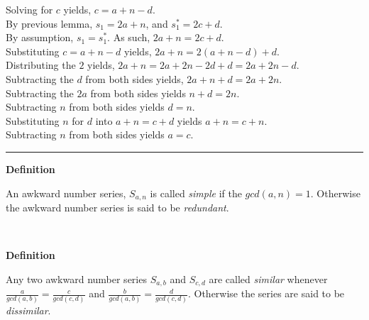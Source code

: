 \documentclass[a4paper,12pt]{article}
\begin{document}
\noindent Solving for $c$ yields, $c = a + n - d$.\\

\noindent By previous lemma, $s_1 = 2a + n$, and $s^*_1 = 2c + d$.\\

\noindent By assumption, $s_1 = s^*_1$. As such, $2a + n = 2c + d$.\\

\noindent Substituting $c = a + n - d$ yields, $2a + n = 2(a + n - d) + d$.\\

\noindent Distributing the $2$ yields, $2a + n = 2a + 2n - 2d + d = 2a + 2n - d$.\\

\noindent Subtracting the $d$ from both sides yields, $2a + n + d = 2a + 2n$.\\

\noindent Subtracting the $2a$ from both sides yields $n + d = 2n$.\\

\noindent Subtracting $n$ from both sides yields $d = n$.\\

\noindent Substituting $n$ for $d$ into $a + n = c + d$ yields $a + n = c + n$.\\

\noindent Subtracting $n$ from both sides yields $a = c$.

\begin{center}
\noindent\rule{8cm}{0.4pt}
\end{center}










\label{definition:simple_and_redundant_series}
\hypertarget{definition:simple_and_redundant_series}{}
\begin{tcolorbox}
\textbf{Definition}

An awkward number series, $S_{a,n}$ is called \textit{simple} if the $gcd(a,n) = 1$. Otherwise the awkward number series is said to be \textit{redundant}.

\end{tcolorbox}
\noindent \\









\label{definition:similar_series}
\hypertarget{definition:similar_series}{}
\begin{tcolorbox}
\textbf{Definition}

Any two awkward number series $S_{a,b}$ and $S_{c,d}$ are called \textit{similar} whenever $\frac{a}{gcd(a,b)} = \frac{c}{gcd(c,d)}$ and $\frac{b}{gcd(a,b)} = \frac{d}{gcd(c,d)}$. Otherwise the series are said to be \textit{dissimilar}.

\end{tcolorbox}
\noindent \\
\end{document}
